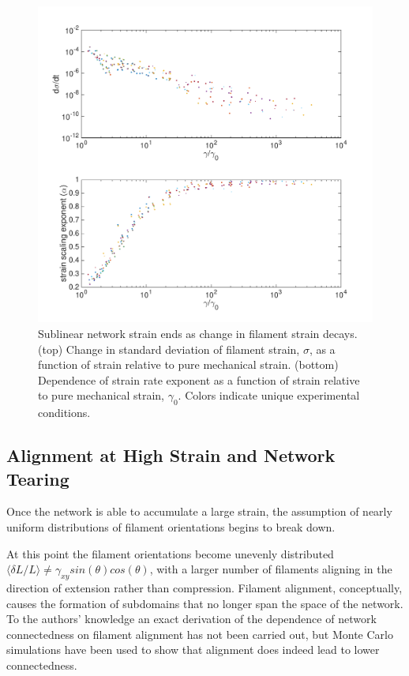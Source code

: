 \begin{figure}[h!]
\centering
\includegraphics[width=\hsize]{slippage/collapse}
\caption{\label{fig:strain_coll} Sublinear network strain ends as change in filament strain decays. (top) Change in standard deviation of filament strain, $\sigma$, as a function of strain relative to pure mechanical strain. (bottom)   Dependence of strain rate exponent as a function of strain relative to pure mechanical strain, $\gamma_0$.  Colors indicate unique experimental conditions. }
\end{figure}




















\subsection{Alignment at High Strain and Network Tearing}

Once the network is able to accumulate a large strain, the assumption of nearly uniform distributions of filament orientations begins to break down.

At this point the filament orientations become unevenly distributed $\langle \delta L / L \rangle \neq \gamma_{xy}sin(\theta)cos(\theta)$, with a larger number of filaments aligning in the direction of extension rather than compression.  Filament alignment, conceptually, causes the formation of subdomains that no longer span the space of the network. To the authors' knowledge an exact derivation of the dependence of network connectedness on filament alignment has not been carried out, but Monte Carlo simulations have been used to show that alignment does indeed lead to lower connectedness\cite{model_percolationanisotropy}.

